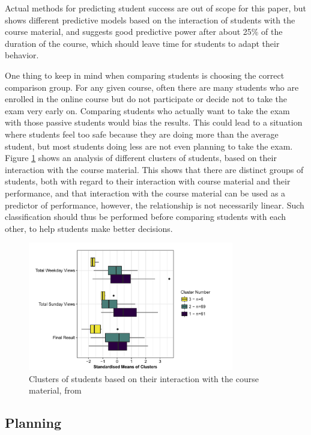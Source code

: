 Actual methods for predicting student success are out of scope for this paper, but \cite{DropoutPrediction-SelfRegulatedLearning} shows different predictive models based on the interaction of students with the course material, and suggests good predictive power after about 25\% of the duration of the course, which should leave time for students to adapt their behavior.


One thing to keep in mind when comparing students is choosing the correct comparison group.
For any given course, often there are many students who are enrolled in the online course but do not participate or decide not to take the exam very early on.
Comparing students who actually want to take the exam with those passive students would bias the results. This could lead to a situation where students feel too safe because they are doing more than the average student, but most students doing less are not even planning to take the exam.
Figure \ref{fig:comp_clusters} shows an analysis of different clusters of students, based on their interaction with the course material. This shows that there are distinct groups of students, both with regard to their interaction with course material and their performance, and that interaction with the course material can be used as a predictor of performance, however, the relationship is not necessarily linear.
Such classification should thus be performed before comparing students with each other, to help students make better decisions.

\begin{figure}
    \centering
    \includegraphics[width=0.8\textwidth]{figures/comp_clusters.png}
    \caption{Clusters of students based on their interaction with the course material, from \cite{PredictionMethods-EarlyWarning}}
    \label{fig:comp_clusters}
\end{figure}

\subsection{Planning}
\label{subsec:planning}

